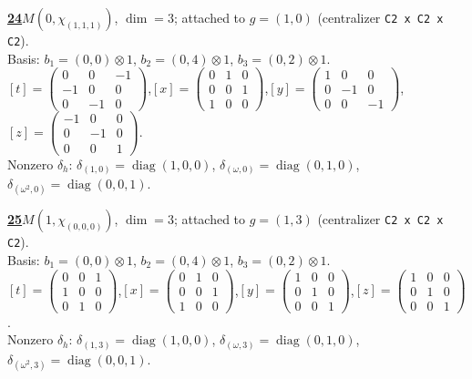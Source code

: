 \begin{samepage}\noindent\textbf{\underline{24}}\quad $M(0,\chi_{(1,1,1)})$, $\dim=3$; attached to $g=(1,0)$ (centralizer \texttt{C2 x C2 x C2}).\\
Basis: $b_{1}=(0,0)\otimes 1$, $b_{2}=(0,4)\otimes 1$, $b_{3}=(0,2)\otimes 1$.\\
$[t]=\left(\begin{smallmatrix} 0 & 0 & -1 \\ -1 & 0 & 0 \\ 0 & -1 & 0 \end{smallmatrix}\right)$,\quad $[x]=\left(\begin{smallmatrix} 0 & 1 & 0 \\ 0 & 0 & 1 \\ 1 & 0 & 0 \end{smallmatrix}\right)$,\quad $[y]=\left(\begin{smallmatrix} 1 & 0 & 0 \\ 0 & -1 & 0 \\ 0 & 0 & -1 \end{smallmatrix}\right)$,\quad $[z]=\left(\begin{smallmatrix} -1 & 0 & 0 \\ 0 & -1 & 0 \\ 0 & 0 & 1 \end{smallmatrix}\right)$.\\
Nonzero $\delta_h$: $\delta_{(1,0)}=\operatorname{diag}(1,0,0)$, $\delta_{(\omega,0)}=\operatorname{diag}(0,1,0)$, $\delta_{(\omega^2,0)}=\operatorname{diag}(0,0,1)$.\end{samepage}
\medskip

\begin{samepage}\noindent\textbf{\underline{25}}\quad $M(1,\chi_{(0,0,0)})$, $\dim=3$; attached to $g=(1,3)$ (centralizer \texttt{C2 x C2 x C2}).\\
Basis: $b_{1}=(0,0)\otimes 1$, $b_{2}=(0,4)\otimes 1$, $b_{3}=(0,2)\otimes 1$.\\
$[t]=\left(\begin{smallmatrix} 0 & 0 & 1 \\ 1 & 0 & 0 \\ 0 & 1 & 0 \end{smallmatrix}\right)$,\quad $[x]=\left(\begin{smallmatrix} 0 & 1 & 0 \\ 0 & 0 & 1 \\ 1 & 0 & 0 \end{smallmatrix}\right)$,\quad $[y]=\left(\begin{smallmatrix} 1 & 0 & 0 \\ 0 & 1 & 0 \\ 0 & 0 & 1 \end{smallmatrix}\right)$,\quad $[z]=\left(\begin{smallmatrix} 1 & 0 & 0 \\ 0 & 1 & 0 \\ 0 & 0 & 1 \end{smallmatrix}\right)$.\\
Nonzero $\delta_h$: $\delta_{(1,3)}=\operatorname{diag}(1,0,0)$, $\delta_{(\omega,3)}=\operatorname{diag}(0,1,0)$, $\delta_{(\omega^2,3)}=\operatorname{diag}(0,0,1)$.\end{samepage}
\medskip

